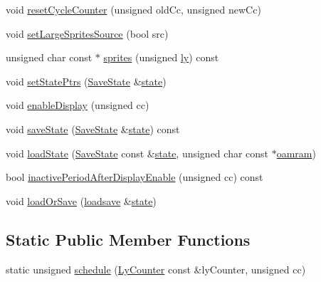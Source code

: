 \begin{DoxyCompactItemize}
void \hyperlink{classgambatte_1_1SpriteMapper_ad59a63b416f0c800bde4e29a5bf73483}{reset\+Cycle\+Counter} (unsigned old\+Cc, unsigned new\+Cc)
\item 
void \hyperlink{classgambatte_1_1SpriteMapper_a8b2c5932b622da5cac4293564295c84d}{set\+Large\+Sprites\+Source} (bool src)
\item 
unsigned char const  $\ast$ \hyperlink{classgambatte_1_1SpriteMapper_a8db6c630bc151ddc188259a88faa069d}{sprites} (unsigned \hyperlink{video_8cpp_ab1c1cf762ec2da5588c30a13cd60af91}{ly}) const
\item 
void \hyperlink{classgambatte_1_1SpriteMapper_a6121ec198af413d2609ef0269f7e1984}{set\+State\+Ptrs} (\hyperlink{structgambatte_1_1SaveState}{Save\+State} \&\hyperlink{ppu_8cpp_a2f2eca6997ee7baf8901725ae074d45b}{state})
\item 
void \hyperlink{classgambatte_1_1SpriteMapper_a4bea9956005c54e0595d2700157a1394}{enable\+Display} (unsigned cc)
\item 
void \hyperlink{classgambatte_1_1SpriteMapper_a0bf6bfd50a86c4675d9ef040870dde9c}{save\+State} (\hyperlink{structgambatte_1_1SaveState}{Save\+State} \&\hyperlink{ppu_8cpp_a2f2eca6997ee7baf8901725ae074d45b}{state}) const
\item 
void \hyperlink{classgambatte_1_1SpriteMapper_a0d629b8f37f68686b87ccaeb8f62dff1}{load\+State} (\hyperlink{structgambatte_1_1SaveState}{Save\+State} const \&\hyperlink{ppu_8cpp_a2f2eca6997ee7baf8901725ae074d45b}{state}, unsigned char const $\ast$\hyperlink{classgambatte_1_1SpriteMapper_a558ee1ff5817b79285f7cc91d627535b}{oamram})
\item 
bool \hyperlink{classgambatte_1_1SpriteMapper_abf83b02b1345c60a560c60a119d87117}{inactive\+Period\+After\+Display\+Enable} (unsigned cc) const
\item 
void \hyperlink{classgambatte_1_1SpriteMapper_a9bda0d2b7ebd6a884dc5a7aea82f2944}{load\+Or\+Save} (\hyperlink{classgambatte_1_1loadsave}{loadsave} \&\hyperlink{ppu_8cpp_a2f2eca6997ee7baf8901725ae074d45b}{state})
\end{DoxyCompactItemize}
\subsection*{Static Public Member Functions}
\begin{DoxyCompactItemize}
\item 
static unsigned \hyperlink{classgambatte_1_1SpriteMapper_afb35f1ed6b01680065e0c9ba7dca73bc}{schedule} (\hyperlink{classgambatte_1_1LyCounter}{Ly\+Counter} const \&ly\+Counter, unsigned cc)
\end{DoxyCompactItemize}
